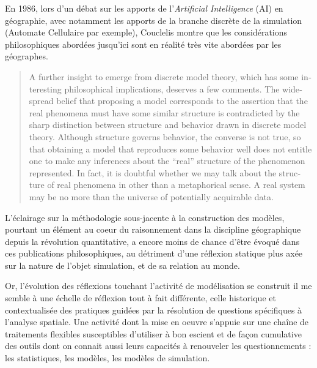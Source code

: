 En 1986, lors d'un débat sur les apports de l'\textit{Artificial Intelligence} (AI) en géographie, avec notamment les apports de la branche discrète de la simulation (Automate Cellulaire par exemple), Couclelis montre que les considérations philosophiques abordées jusqu'ici sont en réalité très vite abordées par les géographes.

\foreignblockquote{english}[\cite{Couclelis1986}]{A further insight to emerge from discrete model theory, which has some interesting philosophical implications, deserves a few comments. The widespread belief that proposing a model corresponds to the assertion that the real phenomena must have some similar structure is contradicted by the sharp distinction between structure and behavior drawn in discrete model theory. Although structure governs behavior, the converse is not true, so that obtaining a model that reproduces some behavior well does not entitle one to make any inferences about the \enquote{real} structure of the phenomenon represented. In fact, it is doubtful whether we may talk about the structure of real phenomena in other than a metaphorical sense. A real system may be no more than the universe of potentially acquirable data.}

L'éclairage sur la méthodologie sous-jacente à la construction des modèles, pourtant un élément au coeur du raisonnement dans la discipline géographique depuis la révolution quantitative, a encore moins de chance d'être évoqué dans ces publications philosophiques, au détriment d'une réflexion statique plus axée sur la nature de l'objet simulation, et de sa relation au monde.

Or, l'évolution des réflexions touchant l'activité de modélisation se construit il me semble à une échelle de réflexion tout à fait différente, celle historique et contextualisée des pratiques guidées par la résolution de questions spécifiques à l'analyse spatiale. Une activité dont la mise en oeuvre s'appuie sur une chaîne de traitements flexibles susceptibles d'utiliser à bon escient et de façon cumulative des outils dont on connait aussi leurs capacités à renouveler les questionnements : les statistiques, les modèles, les modèles de simulation.


